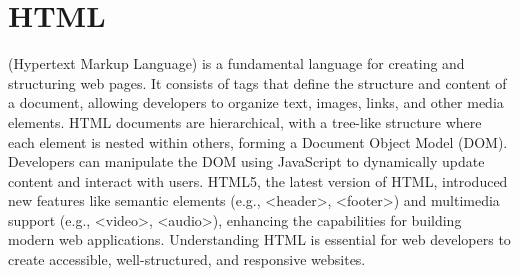 \chapter{HTML}
\thispagestyle{fancy}
\lstset{language=html, style=htmlstyle}

 (Hypertext Markup Language) is a fundamental language for creating and structuring web pages. It consists of tags that define the structure and content of a document, allowing developers to organize text, images, links, and other media elements. HTML documents are hierarchical, with a tree-like structure where each element is nested within others, forming a Document Object Model (DOM). Developers can manipulate the DOM using JavaScript to dynamically update content and interact with users. HTML5, the latest version of HTML, introduced new features like semantic elements (e.g., <header>, <footer>) and multimedia support (e.g., <video>, <audio>), enhancing the capabilities for building modern web applications. Understanding HTML is essential for web developers to create accessible, well-structured, and responsive websites.


